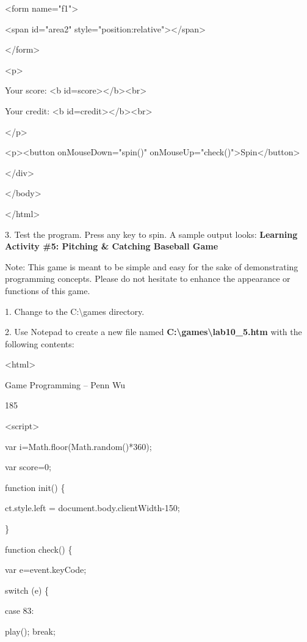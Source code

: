 \documentclass[
]{article}
\begin{document}
\textless form name="f1"\textgreater{}

\textless span id="area2"
style="position:relative"\textgreater\textless/span\textgreater{}

\textless/form\textgreater{}

\textless p\textgreater{}

Your score: \textless b
id=score\textgreater\textless/b\textgreater\textless br\textgreater{}

Your credit: \textless b
id=credit\textgreater\textless/b\textgreater\textless br\textgreater{}

\textless/p\textgreater{}

\textless p\textgreater\textless button onMouseDown="spin()"
onMouseUp="check()"\textgreater Spin\textless/button\textgreater{}

\textless/div\textgreater{}

\textless/body\textgreater{}

\textless/html\textgreater{}

3. Test the program. Press any key to spin. A sample output looks:
\textbf{Learning Activity \#5: Pitching \& Catching Baseball Game}

Note: This game is meant to be simple and easy for the sake of
demonstrating programming concepts. Please do not hesitate to enhance
the appearance or functions of this game.

1. Change to the C:\textbackslash games directory.

2. Use Notepad to create a new file named
\textbf{C:\textbackslash games\textbackslash lab10\_5.htm} with the
following contents:

\textless html\textgreater{}

Game Programming -- Penn Wu

185

\protect\hypertarget{index_split_011.htmlux5cux23p186}{}{}\textless script\textgreater{}

var i=Math.floor(Math.random()*360);

var score=0;

function init() \{

ct.style.left = document.body.clientWidth-150;

\}

function check() \{

var e=event.keyCode;

switch (e) \{

case 83:

play(); break;
\end{document}
